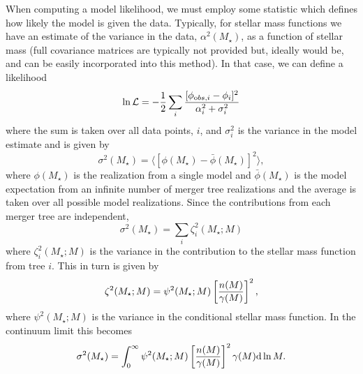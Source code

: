 When computing a model likelihood, we must employ some statistic which defines how likely the model is given the data. Typically, for stellar mass functions we have an estimate of the variance in the data, $\alpha^2(M_\star)$, as a function of stellar mass (full covariance matrices are typically not provided but, ideally would be, and can be easily incorporated into this method). In that case, we can define a likelihood
\begin{equation}
 \ln \mathcal{L} = - {1 \over 2} \sum_i {[\phi_{{\mathrm obs},i} - \phi_i]^2 \over \alpha_i^2 + \sigma_i^2}
\end{equation}
where the sum is taken over all data points, $i$, and $\sigma_i^2$ is the variance in the model estimate and is given by
\begin{equation}
 \sigma^2(M_\star) = \langle [\phi(M_\star) - \bar{\phi}(M_\star)]^2 \rangle,
\end{equation}
where $\phi(M_\star)$ is the realization from a single model and $\bar{\phi}(M_\star)$ is the model expectation from an infinite number of merger tree realizations and the average is taken over all possible model realizations. Since the contributions from each merger tree are independent, 
\begin{equation}
 \sigma^2(M_\star) = \sum_i \zeta_i^2(M_\star;M)
\end{equation}
where $\zeta_i^2(M_\star;M)$ is the variance in the contribution to the stellar mass function from tree $i$. This in turn is given by
\begin{equation}
 \zeta^2(M_\star;M) = \psi^2(M_\star;M) \left[{n(M) \over \gamma(M)}\right]^2,
\end{equation}
where $\psi^2(M_\star;M)$ is the variance in the conditional stellar mass function. In the continuum limit this becomes
\begin{equation}
 \sigma^2(M_\star) = \int_0^\infty \psi^2(M_\star;M) \left[{n(M) \over \gamma(M)}\right]^2 \gamma(M) \d \ln M.
\end{equation}

